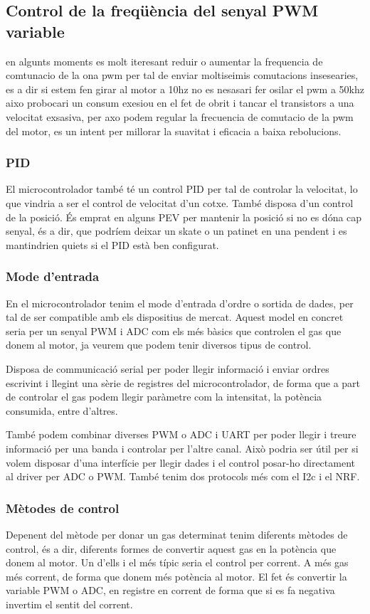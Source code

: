 \subsection{Control de la freqüència del senyal PWM variable}
en algunts moments es molt iteresant reduir o aumentar la frequencia de comtunacio de la ona pwm per tal de enviar moltiseimis comutacions insesearies, es a dir si estem fen girar al motor a 10hz no es nesasari fer osilar el pwm a 50khz aixo probocari un consum exesiou en el fet de obrit i tancar el transistors a una velocitat exsasiva, per axo podem regular la frecuencia de comutacio de la pwm del motor, es un intent per millorar la suavitat i eficacia a baixa rebolucions.

\subsubsection{PID}
El microcontrolador també té un control PID per tal de controlar la velocitat, lo que vindria a ser el control de velocitat d'un cotxe. També disposa d'un control de la posició. És emprat en alguns PEV per mantenir la posició si no es dóna cap senyal, és a dir, que podríem deixar un skate o un patinet en una pendent i es mantindrien quiets si el PID està ben configurat.

\subsubsection{Mode d'entrada}
En el microcontrolador tenim el mode d'entrada d'ordre o sortida de dades, per tal de ser compatible amb els dispositius de mercat. Aquest model en concret seria per un senyal PWM i ADC com els més bàsics que controlen el gas que donem al motor, ja veurem que podem tenir diversos tipus de control.

Disposa de communicació serial per poder llegir informació i enviar ordres escrivint i llegint una sèrie de registres del microcontrolador, de forma que a part de controlar el gas podem llegir paràmetre com la intensitat, la potència consumida, entre d'altres.

També podem combinar diverses PWM o ADC i UART per poder llegir i treure informació per una banda i controlar per l'altre canal. Això podria ser útil per si volem disposar d'una interfície per llegir dades i el control posar-ho directament al driver per ADC o PWM. També tenim dos protocols més com el I2c i el NRF.
       
\subsubsection{Mètodes de control}
 Depenent del mètode per donar un gas determinat tenim diferents mètodes de control, és a dir, diferents formes de convertir aquest gas en la potència que donem al motor. Un d'ells i el més típic seria el control per corrent. A més gas més corrent, de forma que donem més potència al motor. El fet és convertir la variable PWM o ADC, en registre en corrent de forma que si es fa negativa invertim el sentit del corrent.
 
